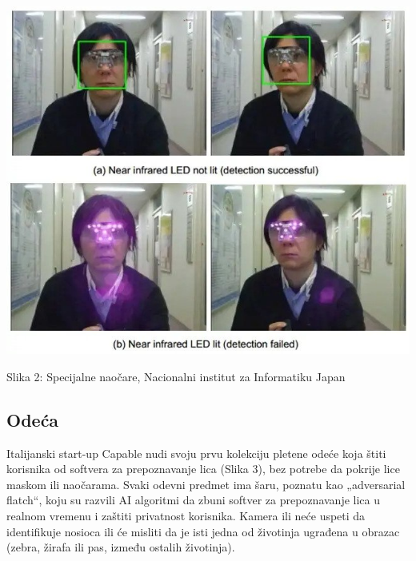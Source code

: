 \documentclass{article}
\begin{document}
\begin{center}
\begin{minipage}{0.5\textwidth}
\includegraphics[width=\textwidth]{naocare.jpg}
\end{minipage}

\vspace{0.5cm}

Slika 2: Specijalne naočare, Nacionalni institut za Informatiku Japan
\end{center}


\subsection{Odeća}
Italijanski start-up Capable nudi svoju prvu kolekciju pletene odeće koja štiti korisnika od softvera za prepoznavanje lica (Slika 3), bez potrebe da pokrije lice maskom ili naočarama. Svaki odevni predmet ima šaru, poznatu kao „adversarial flatch“, koju su razvili AI algoritmi da zbuni softver za prepoznavanje lica u realnom vremenu i zaštiti privatnost korisnika. Kamera ili neće uspeti da identifikuje nosioca ili će misliti da je isti jedna od životinja ugrađena u obrazac (zebra, žirafa ili pas, između ostalih životinja). 
\end{document}
